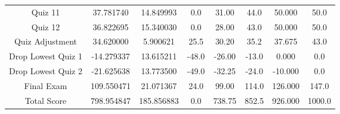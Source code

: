 \documentclass[9pt,twoside]{exam}
\begin{document}
\begin{center}
\begin{tabular}{ c c c c c c c c}
 Quiz 11 &   37.781740 & 14.849993 & 0.0  &    31.00    &  44.0   &   50.000  &    50.0
\\  
 Quiz 12 &  36.822695 & 15.340030 &0.0    &  28.00  &    43.0    &50.000  &    50.0\\  
 Quiz Adjustment &  34.620000 & 5.900621 & 25.5   &   30.20 &     35.2 &     37.675&      43.0\\  
 Drop Lowest Quiz 1 &  -14.279337 & 13.615211 &  -48.0   &  -26.00   &  -13.0 &      0.000   &    0.0 \\  
 Drop Lowest Quiz 2 &  -21.625638 & 13.773500 & -49.0   &  -32.25  &   -24.0     &-10.000    &   0.0 \\  
 Final Exam &   109.550471 & 21.071367 &  24.0  &    99.00 &    114.0  &   126.000  &   147.0 \\  
 Total Score &  798.954847 & 185.856883 & 0.0  &   738.75 &    852.5  &   926.000&    1000.0
\\  

\end{tabular}
\end{center}
\end{document}
